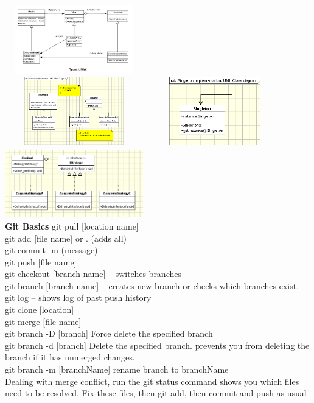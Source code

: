 \documentclass{article}
\begin{document}
\includegraphics[width=6cm,height =3cm]{MVC.png}\\
\includegraphics[width=6cm,height =3cm]{obs.png}
\includegraphics[width=6cm,height =3cm]{Singleton.png}
\includegraphics[width=6cm,height =3cm]{Strategy.png}\\
\textbf{Git Basics}
git pull [location name]\\
git add [file name] or . (adds all)\\
git commit -m (message)\\
git push [file name]\\
git checkout [branch name] -- switches branches\\
git branch [branch name] -- creates new branch or checks which branches exist.\\
git log -- shows log of past push history\\
git clone [location]\\
git merge [file name] \\
git branch -D [branch] Force delete the specified branch\\
git branch -d [branch] Delete the specified branch. prevents you from deleting the branch if it has unmerged changes.\\
git branch -m [branchName] rename branch to branchName\\
Dealing with merge conflict, run the git status command shows you which files need to be resolved, Fix these files, then git add, then commit and push as usual\\
\end{document}
